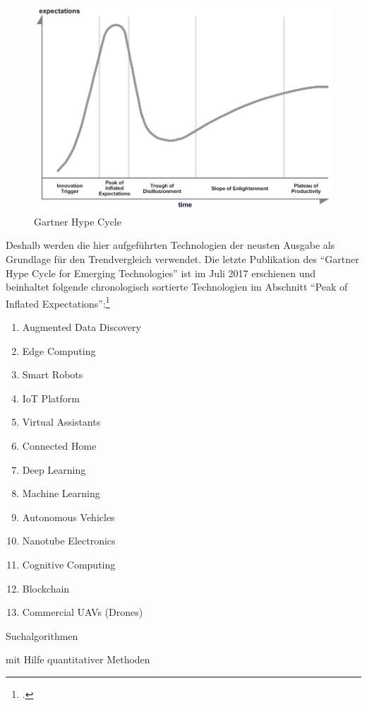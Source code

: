 \begin{figure}
	\centering
	\includegraphics[width=0.9\linewidth]{abbildungen/ghc}
	\caption{Gartner Hype Cycle}
	\label{fig:ghc}
\end{figure}

Deshalb werden die hier aufgeführten Technologien der neusten Ausgabe als Grundlage für den Trendvergleich verwendet. Die letzte Publikation des 
"`Gartner Hype Cycle for Emerging Technologies"' ist im Juli 2017 erschienen und beinhaltet folgende chronologisch sortierte Technologien im Abschnitt "`Peak of Inflated Expectations"':\footcite[Vgl.][S.34-55]{Walker2017}
\begin{enumerate}
	\item Augmented Data Discovery
	\item Edge Computing
	\item Smart Robots
	\item IoT Platform
	\item Virtual Assistants
	\item Connected Home
	\item Deep Learning
	\item Machine Learning
	\item Autonomous Vehicles
	\item Nanotube Electronics
	\item Cognitive Computing
	\item Blockchain
	\item Commercial UAVs (Drones)
\end{enumerate}



Suchalgorithmen


mit Hilfe quantitativer Methoden